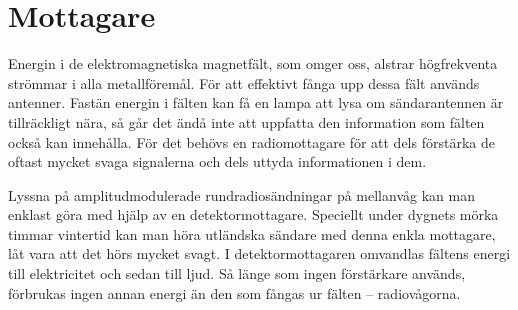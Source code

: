 \chapter{Mottagare}
\label{ch:mottagare}

Energin i de elektromagnetiska magnetfält, som omger oss, alstrar högfrekventa
strömmar i alla metallföremål.
För att effektivt fånga upp dessa fält används antenner.
Fastän energin i fälten kan få en lampa att lysa om sändarantennen är
tillräckligt nära, så går det ändå inte att uppfatta den information som fälten
också kan innehålla.
För det behövs en radiomottagare för att dels förstärka de oftast mycket svaga
signalerna och dels uttyda informationen i dem.

Lyssna på amplitudmodulerade rundradiosändningar på mellanvåg kan man enklast
göra med hjälp av en detektormottagare.
Speciellt under dygnets mörka timmar vintertid kan man höra utländska sändare
med denna enkla mottagare, låt vara att det hörs mycket svagt.
I detektormottagaren omvandlas fältens energi till elektricitet och sedan till
ljud.
Så länge som ingen förstärkare används, förbrukas ingen annan energi än den som
fångas ur fälten -- radiovågorna.
